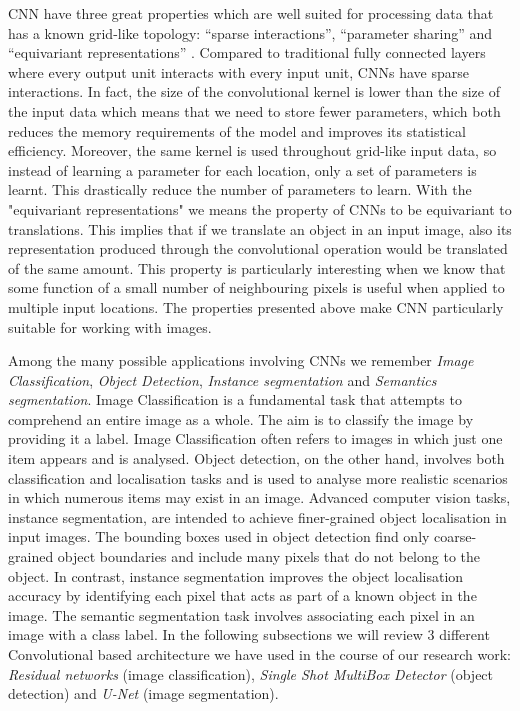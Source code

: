 CNN have three great properties which are well suited for processing data that has a known grid-like topology: “sparse interactions”, “parameter sharing” and “equivariant representations” \citep{goodfellow2016deep}. Compared to traditional fully connected layers where every output unit interacts with every input unit, CNNs have sparse interactions. In fact, the size of the convolutional kernel is lower than the size of the input data which means that we need to store fewer parameters, which both reduces the memory requirements of the model and improves its statistical efficiency. Moreover, the same kernel is used throughout grid-like input data, so instead of learning a parameter for each location, only a set of parameters is
learnt. This drastically reduce the number of parameters to learn. With the "equivariant representations" we means the property of CNNs to be equivariant to translations. This implies that if we translate an object in an input image, also its representation produced through the convolutional operation would be translated of the same amount. This property is particularly interesting when we know that some function of a small number of neighbouring pixels is useful when applied to multiple input locations. The properties presented above make CNN particularly suitable for working with images. 

Among the many possible applications involving CNNs we remember \textit{Image Classification}, \textit{Object Detection}, \textit{Instance segmentation} and \textit{Semantics segmentation}. Image Classification is a fundamental task that attempts to comprehend an entire image as a whole. The aim is to classify the image by providing it a label. Image Classification often refers to images in which just one item appears and is analysed. Object detection, on the other hand, involves both classification and localisation tasks and is used to analyse more realistic scenarios in which numerous items may exist in an image. Advanced computer vision tasks, instance segmentation, are intended to achieve finer-grained object localisation in input images. The bounding boxes used in object detection find only coarse-grained object boundaries and include many pixels that do not belong to the object. In contrast, instance segmentation improves the object localisation accuracy by identifying each pixel that acts as part of a known object in the image. The semantic segmentation task involves associating each pixel in an image with a class label. In the following subsections we will review 3 different Convolutional based architecture we have used in the course of our research work: \textit{Residual networks} (image classification), \textit{Single Shot MultiBox Detector} (object detection) and \textit{U-Net} (image segmentation).

